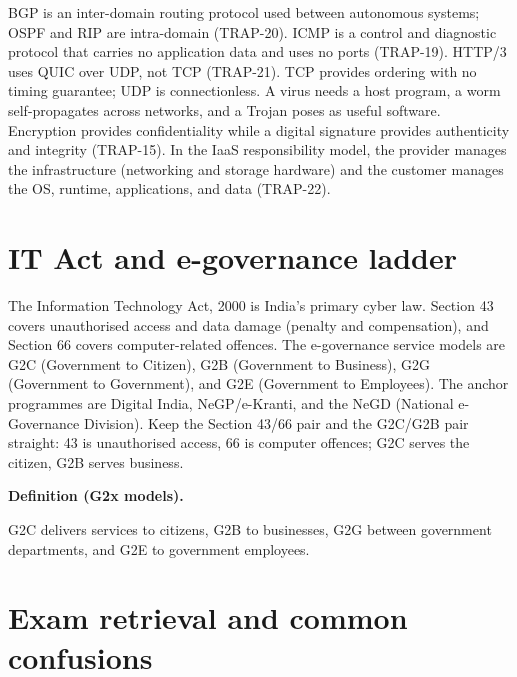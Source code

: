 \documentclass[11pt]{article}
\newenvironment{definitionbox}[1]{%
  \par\noindent\textbf{Definition (#1).}\ \itshape
}{\par\vspace{0.3em}}
\begin{document}
BGP is an inter-domain routing protocol used between autonomous systems; OSPF
and RIP are intra-domain (TRAP-20). ICMP is a control and diagnostic protocol
that carries no application data and uses no ports (TRAP-19). HTTP/3 uses QUIC
over UDP, not TCP (TRAP-21). TCP provides ordering with no timing guarantee;
UDP is connectionless. A virus needs a host program, a worm self-propagates
across networks, and a Trojan poses as useful software. Encryption provides
confidentiality while a digital signature provides authenticity and integrity
(TRAP-15). In the IaaS responsibility model, the provider manages the
infrastructure (networking and storage hardware) and the customer manages the
OS, runtime, applications, and data (TRAP-22).

\section{IT Act and e-governance ladder}

The Information Technology Act, 2000 is India's primary cyber law. Section 43
covers unauthorised access and data damage (penalty and compensation), and
Section 66 covers computer-related offences. The e-governance service models
are G2C (Government to Citizen), G2B (Government to Business), G2G
(Government to Government), and G2E (Government to Employees). The anchor
programmes are Digital India, NeGP/e-Kranti, and the NeGD (National
e-Governance Division). Keep the Section 43/66 pair and the G2C/G2B pair
straight: 43 is unauthorised access, 66 is computer offences; G2C serves the
citizen, G2B serves business.

\begin{definitionbox}{G2x models}
G2C delivers services to citizens, G2B to businesses, G2G between government
departments, and G2E to government employees.
\end{definitionbox}

\section{Exam retrieval and common confusions}
\end{document}
